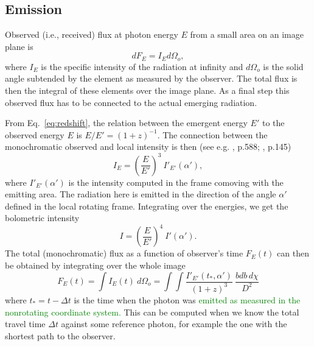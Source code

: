 \documentclass{aa}
\newcommand{\be}{\begin{equation}}
\newcommand{\ee}{\end{equation}}
\newcommand{\red}[1]{\textcolor{red}{#1}}
\newcommand{\refe}[1]{\textcolor{green}{{#1}}}
\newcommand{\refedel}[1]{\textcolor{red}{\sout{#1}}}
\begin{document}


\subsection{Emission}\label{sect:emission}
Observed (i.e., received) flux at photon energy $E$ from a small area on an image plane is
\be
dF_E = I_E d\Omega_o,
\ee
where $I_E$ is the specific intensity of the radiation at infinity and $d\Omega_o$ is the solid angle subtended by the element as measured by the observer. 
The total flux is then the integral of these elements over the image plane.
As a final step this observed flux has to be connected to the actual emerging radiation.

From Eq.~\eqref{eq:redshift}, the relation between the emergent energy $E'$ to the observed energy $E$ is $E/E' = (1 + z)^{-1}$.
The connection between the monochromatic observed and local intensity is then (see e.g. \citealt{MTW73}, p.588; \citealt{RL79}, p.145)
\be
I_E = \left( \frac{E}{E'} \right)^3 ~I'_{E'}(\alpha'),
\ee
where $I'_{E'}(\alpha')$ is the intensity computed in the frame comoving with the emitting area.
The radiation here is emitted in the direction of the angle $\alpha'$ defined in the local rotating frame.
Integrating over the energies, we get the bolometric intensity
\be
I = \left(\frac{E}{E'} \right)^4 ~I'(\alpha').
\ee
The total (monochromatic) flux as a function of observer's time $F_E(t)$ can then be obtained by integrating over the whole image
\be\label{eq:fluxint}
F_E(t) = \int I_{E}(t) ~d\Omega_o = \int\int \frac{I'_{E'}(t_*, \alpha')}{(1+z)^3}  ~\frac{bdb \, d\chi}{D^2}
\ee
where $t_* = t - \Delta t$ is the time when the photon was \refe{emitted as measured in the nonrotating coordinate system.}
This can be computed when we know the total travel time $\Delta t$ against some reference photon, for example the one with the shortest path to the observer.
\end{document}
